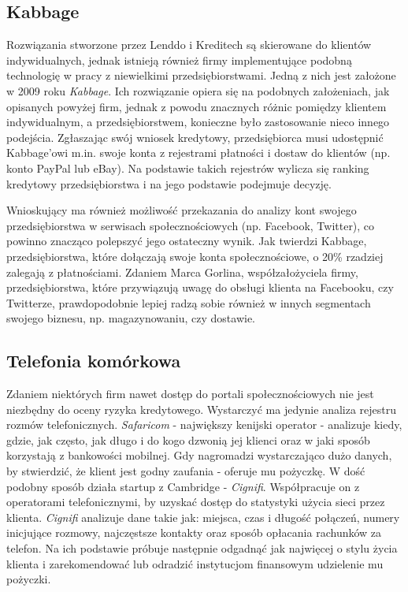 \documentclass[polish]{kbk}
\begin{document}
\subsection{Kabbage \cite{cnn-tech, kabbage}} 
Rozwiązania stworzone przez Lenddo i Kreditech są skierowane do klientów indywidualnych, jednak istnieją również firmy implementujące podobną technologię w pracy z niewielkimi przedsiębiorstwami. Jedną z nich jest założone w 2009 roku \textit{Kabbage}. Ich rozwiązanie opiera się na podobnych założeniach, jak opisanych powyżej firm, jednak z powodu znacznych różnic pomiędzy klientem indywidualnym, a przedsiębiorstwem, konieczne było zastosowanie nieco innego podejścia. Zgłaszając swój wniosek kredytowy, przedsiębiorca musi udostępnić Kabbage'owi m.in. swoje konta z rejestrami płatności i dostaw do klientów (np. konto PayPal lub eBay). Na podstawie takich rejestrów wylicza się ranking kredytowy przedsiębiorstwa i na jego podstawie podejmuje decyzję.

Wnioskujący ma również możliwość przekazania do analizy kont swojego przedsiębiorstwa w serwisach społecznościowych (np. Facebook, Twitter), co powinno znacząco polepszyć jego ostateczny wynik. Jak twierdzi Kabbage, przedsiębiorstwa, które dołączają swoje konta społecznościowe, o 20\% rzadziej zalegają z płatnościami. Zdaniem Marca Gorlina, współzałożyciela firmy, przedsiębiorstwa, które przywiązują uwagę do obsługi klienta na Facebooku, czy Twitterze, prawdopodobnie lepiej radzą sobie również w innych segmentach swojego biznesu, np. magazynowaniu, czy dostawie.

\subsection{Telefonia komórkowa \cite{slate, cignifi}}
Zdaniem niektórych firm nawet dostęp do portali społecznościowych nie jest niezbędny do oceny ryzyka kredytowego. Wystarczyć ma jedynie analiza rejestru rozmów telefonicznych. \textit{Safaricom} - największy kenijski operator - analizuje kiedy, gdzie, jak często, jak długo i do kogo dzwonią jej klienci oraz w jaki sposób korzystają z bankowości mobilnej. Gdy nagromadzi wystarczająco dużo danych, by stwierdzić, że klient jest godny zaufania - oferuje mu pożyczkę. W dość podobny sposób działa startup z Cambridge - \textit{Cignifi}. Współpracuje on z operatorami telefonicznymi, by uzyskać dostęp do statystyki użycia sieci przez klienta. \textit{Cignifi} analizuje dane takie jak: miejsca, czas i długość połączeń, numery inicjujące rozmowy, najczęstsze kontakty oraz sposób opłacania rachunków za telefon. Na ich podstawie próbuje następnie odgadnąć jak najwięcej o stylu życia klienta i zarekomendować lub odradzić instytucjom finansowym udzielenie mu pożyczki.
\end{document}
